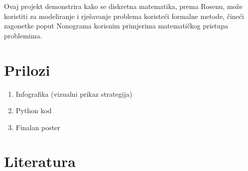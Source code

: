 \documentclass[a4paper,12pt]{article}
\begin{document}
Ovaj projekt demonstrira kako se diskretna matematika, prema Rosenu, može koristiti za modeliranje i rješavanje problema koristeći formalne metode, čineći zagonetke poput Nonograma korisnim primjerima matematičkog pristupa problemima\cite{knjiga1}.
\clearpage


\section{Prilozi}
\begin{enumerate}
    \item Infografika (vizualni prikaz strategija)
    \item Python kod
    \item Finalan poster
\end{enumerate}


\clearpage
\section{Literatura}
\printbibliography[heading=none]
\end{document}
